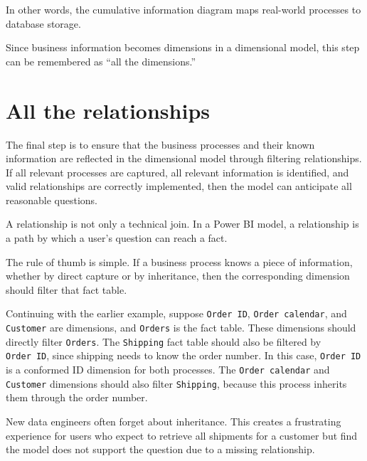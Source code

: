 \documentclass[10pt,openany,10pt]{book}
\begin{document}
In other words, the cumulative information diagram maps real-world
processes to database storage.

Since business information becomes dimensions in a dimensional model,
this step can be remembered as ``all the dimensions.''

\section{All the relationships}\label{all-the-relationships}

The final step is to ensure that the business processes and their known
information are reflected in the dimensional model through filtering
relationships. If all relevant processes are captured, all relevant
information is identified, and valid relationships are correctly
implemented, then the model can anticipate all reasonable questions.

A relationship is not only a technical join. In a Power BI model, a
relationship is a path by which a user's question can reach a fact.

The rule of thumb is simple. If a business process knows a piece of
information, whether by direct capture or by inheritance, then the
corresponding dimension should filter that fact table.

Continuing with the earlier example, suppose
\texttt{\textquotesingle{}Order\ ID\textquotesingle{}},
\texttt{\textquotesingle{}Order\ calendar\textquotesingle{}}, and
\texttt{\textquotesingle{}Customer\textquotesingle{}} are dimensions,
and \texttt{\textquotesingle{}Orders\textquotesingle{}} is the fact
table. These dimensions should directly filter
\texttt{\textquotesingle{}Orders\textquotesingle{}}. The
\texttt{\textquotesingle{}Shipping\textquotesingle{}} fact table should
also be filtered by
\texttt{\textquotesingle{}Order\ ID\textquotesingle{}}, since shipping
needs to know the order number. In this case,
\texttt{\textquotesingle{}Order\ ID\textquotesingle{}} is a conformed ID
dimension for both processes. The
\texttt{\textquotesingle{}Order\ calendar\textquotesingle{}} and
\texttt{\textquotesingle{}Customer\textquotesingle{}} dimensions should
also filter \texttt{\textquotesingle{}Shipping\textquotesingle{}},
because this process inherits them through the order number.

New data engineers often forget about inheritance. This creates a
frustrating experience for users who expect to retrieve all shipments
for a customer but find the model does not support the question due to a
missing relationship.
\end{document}
